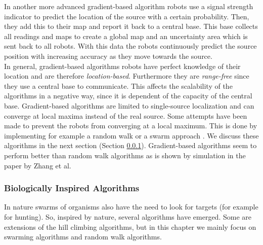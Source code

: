     In another more advanced gradient-based algorithm robots use a signal strength indicator to predict the location of the source with a certain probability.
    Then, they add this to their map and report it back to a central base.
    This base collects all readings and maps to create a global map and an uncertainty area which is sent back to all robots.
    With this data the robots continuously predict the source position with increasing accuracy as they move towards the source. \cite{zhang2009gradient}\\

    In general, gradient-based algorithms robots have perfect knowledge of their location and are therefore \emph{location-based}.
    Furthermore they are \emph{range-free} since they use a central base to communicate.
    This affects the scalability of the algorithms in a negative way, since it is dependent of the capacity of the central base.
    Gradient-based algorithms are limited to single-source localization and can converge at local maxima instead of the real source.
    Some attempts have been made to prevent the robots from converging at a local maximum.
    This is done by implementing for example a random walk \cite{dhariwal2004bacterium} or a swarm approach \cite{cui2004swarm}.
    We discuss these algorithms in the next section (Section \ref{subsubsec:BiologicallyInspired}).
    Gradient-based algorithms seem to perform better than random walk algorithms as is shown by simulation in the paper by Zhang et al. \cite{zhang2009gradient}

  \subsubsection{Biologically Inspired Algorithms}
    \label{subsubsec:BiologicallyInspired}
    In nature swarms of organisms also have the need to look for targets (for example for hunting).
    So, inspired by nature, several algorithms have emerged.
    Some are extensions of the hill climbing algorithms, but in this chapter we mainly focus on swarming algorithms and random walk algorithms.\\

